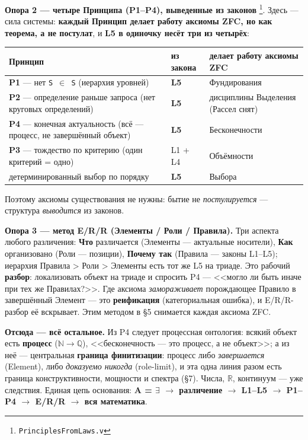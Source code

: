 \documentclass[11pt,a4paper]{article}
\begin{document}
\textbf{Опора 2 --- четыре Принципа (P1--P4), выведенные из законов} \footnote{\texttt{Principles\allowbreak{}From\allowbreak{}Laws.v}}. Здесь --- сила системы: \textbf{каждый Принцип делает работу аксиомы ZFC, но как теорема, а не постулат}, и \textbf{L5 в одиночку несёт три из четырёх}:

{\footnotesize\setlength{\tabcolsep}{4pt}\renewcommand{\arraystretch}{1.2}\begin{tabularx}{\linewidth}{|X|X|X|}
\hline
\textbf{Принцип} & \textbf{из закона} & \textbf{делает работу аксиомы ZFC} \\ \hline
\textbf{P1} --- нет \texttt{S $\in$ S} (иерархия уровней) & \textbf{L5} & Фундирования \\ \hline
\textbf{P2} --- определение раньше запроса (нет круговых определений) & \textbf{L5} & дисциплины Выделения (Рассел снят) \\ \hline
\textbf{P4} --- конечная актуальность (всё --- процесс, не завершённый объект) & \textbf{L5} & Бесконечности \\ \hline
\textbf{P3} --- тождество по критерию (один критерий = одно) & L1 + L4 & Объёмности \\ \hline
детерминированный выбор по порядку & \textbf{L5} & Выбора \\ \hline
\end{tabularx}}

Поэтому аксиомы существования не нужны: бытие не \emph{постулируется} --- структура \emph{выводится} из законов.

\textbf{Опора 3 --- метод E/R/R (Элементы / Роли / Правила).} Три аспекта любого различения: \textbf{Что} различается (Элементы --- актуальные носители), \textbf{Как} организовано (Роли --- позиции), \textbf{Почему так} (Правила --- законы L1--L5); иерархия Правила > Роли > Элементы есть тот же L5 на триаде. Это рабочий \textbf{разбор}: локализовать объект на триаде и спросить P4 --- <<могло ли быть иначе при тех же Правилах?>>. Где аксиома \emph{замораживает} порождающее Правило в завершённый Элемент --- это \textbf{реификация} (категориальная ошибка), и E/R/R-разбор её вскрывает. Этим методом в \S{}5 снимается каждая аксиома ZFC.

\textbf{Отсюда --- всё остальное.} Из P4 следует процессная онтология: всякий объект есть \textbf{процесс} ($\mathbb{N}$$\to$$\mathbb{Q}$), <<бесконечность --- это процесс, а не объект>>; а из неё --- центральная \textbf{граница финитизации}: процесс либо \emph{завершается} (Element), либо \emph{доказуемо никогда} (role-limit), и эта одна линия разом есть граница конструктивности, мощности и спектра (\S{}7). Числа, $\mathbb{R}$, континуум --- уже следствия. Единая цепь основания: \textbf{A = $\exists$ $\to$ различение $\to$ L1--L5 $\to$ P1--P4 $\to$ E/R/R $\to$ вся математика}.
\end{document}
